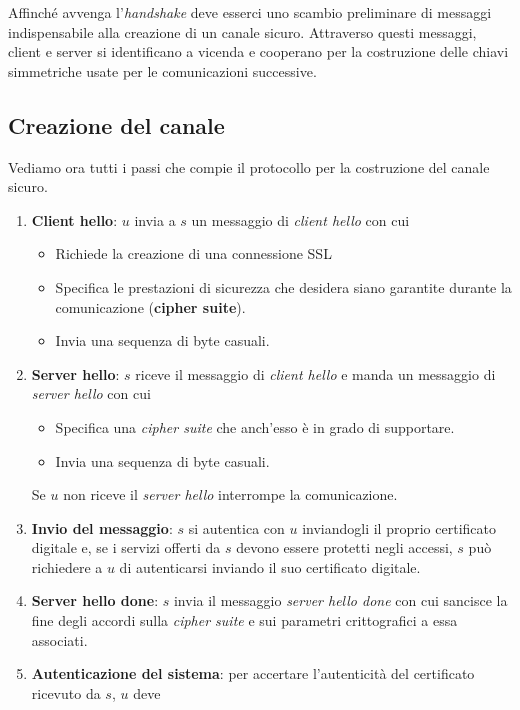 Affinch\'e avvenga l'\emph{handshake} deve esserci uno scambio preliminare di messaggi indispensabile alla creazione
di un canale sicuro. Attraverso questi messaggi, client e server si identificano a vicenda e cooperano per la
costruzione delle chiavi simmetriche usate per le comunicazioni successive.

\subsection{Creazione del canale}
Vediamo ora tutti i passi che compie il protocollo per la costruzione del canale sicuro.

\begin{enumerate}
	\item \textbf{Client hello}: $u$ invia a $s$ un messaggio di \emph{client hello} con cui
	      \begin{itemize}
		      \item Richiede la creazione di una connessione SSL
		      \item Specifica le prestazioni di sicurezza che desidera siano garantite durante la comunicazione
		            (\textbf{cipher suite}).
		      \item Invia una sequenza di byte casuali.
	      \end{itemize}
	\item \textbf{Server hello}: $s$ riceve il messaggio di \emph{client hello} e manda un messaggio di
	      \emph{server hello} con cui
	      \begin{itemize}
		      \item Specifica una \emph{cipher suite} che anch'esso \`e in grado di supportare.
		      \item Invia una sequenza di byte casuali.
	      \end{itemize}
	      Se $u$ non riceve il \emph{server hello} interrompe la comunicazione.
	\item \textbf{Invio del messaggio}: $s$ si autentica con $u$ inviandogli il proprio certificato digitale e, se
	      i servizi offerti da $s$ devono essere protetti negli accessi, $s$ pu\`o richiedere a $u$ di autenticarsi
	      inviando il suo certificato digitale.
	\item \textbf{Server hello done}: $s$ invia il messaggio \emph{server hello done} con cui sancisce la fine degli
	      accordi sulla \emph{cipher suite} e sui parametri crittografici a essa associati.
	\item \textbf{Autenticazione del sistema}: per accertare l'autenticit\`a del certificato ricevuto da $s$, $u$ deve

\end{enumerate}
